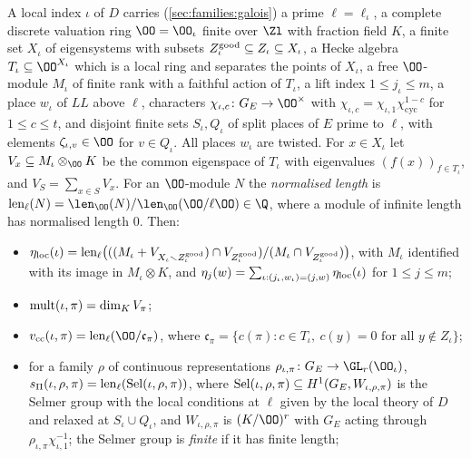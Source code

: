\begin{definition}\label{pf:linkN-sel:inv}
A local index $\iota$ of $D$ carries (\cref{sec:families:galois}) a prime $\ell=\ell_\iota$, a complete discrete valuation ring
$\OO=\OO_\iota$ finite over $\Zl$ with fraction field $K$, a finite set $X_\iota$ of eigensystems with subsets
$Z^{\mathrm{good}}_\iota\subseteq Z_\iota\subseteq X_\iota$, a Hecke algebra $T_\iota\subseteq\OO^{X_\iota}$ which is a local ring and
separates the points of $X_\iota$, a free $\OO$-module $M_\iota$ of finite rank with a faithful action of $T_\iota$, a lift index
$1\le j_\iota\le m$, a place $w_\iota$ of $\mathit{LL}$ above $\ell$, characters $\chi_{\iota,c}\colon G_E\to\OO^\times$ with
$\chi_{\iota,c}=\chi_{\iota,1}\chi_{\mathrm{cyc}}^{1-c}$ for $1\le c\le t$, and disjoint finite sets $S_\iota,Q_\iota$ of split places
of $E$ prime to $\ell$, with elements $\zeta_{\iota,v}\in\OO$ for $v\in Q_\iota$. All places $w_\iota$ are twisted. For $x\in X_\iota$
let $V_x\subseteq M_\iota\otimes_\OO K$ be the common eigenspace of $T_\iota$ with eigenvalues $(f(x))_{f\in T_\iota}$, and
$V_S=\sum_{x\in S}V_x$. For an $\OO$-module $N$ the \emph{normalised length} is
$\linkNsellen(N)=\len_\OO(N)/\len_\OO(\OO/\ell\OO)\in\Q$, where a module of infinite length has normalised length $0$. Then:
\begin{itemize}
\item $\eta_{\mathrm{loc}}(\iota)=\operatorname{len}_{\ell}\bigl(((M_\iota+V_{X_\iota\smallsetminus Z^{\mathrm{good}}_\iota})\cap V_{Z^{\mathrm{good}}_\iota})/
(M_\iota\cap V_{Z^{\mathrm{good}}_\iota})\bigr)$, with $M_\iota$ identified with its image in $M_\iota\otimes K$, and
$\eta_j(w)=\sum_{\iota:(j_\iota,w_\iota)=(j,w)}\eta_{\mathrm{loc}}(\iota)$ for $1\le j\le m$;
\item $\mathrm{mult}(\iota,\pi)=\dim_KV_\pi$;
\item $\linkNselvcc(\iota,\pi)=\linkNsellen(\OO/\mathfrak c_\pi)$, where $\mathfrak c_\pi=\{c(\pi):c\in T_\iota,\ c(y)=0\text{ for all }
y\notin Z_\iota\}$;
\item for a family $\rho$ of continuous representations $\rho_{\iota,\pi}\colon G_E\to\GL_r(\OO_\iota)$,
$s_{\Pi}(\iota,\rho,\pi)=\operatorname{len}_{\ell}(\operatorname{Sel}(\iota,\rho,\pi))$, where $\operatorname{Sel}(\iota,\rho,\pi)\subseteq
H^1(G_E,W_{\iota,\rho,\pi})$ is the Selmer group with the local conditions at $\ell$ given by the local theory of $D$ and relaxed at
$S_\iota\cup Q_\iota$, and $W_{\iota,\rho,\pi}$ is $(K/\OO)^r$ with $G_E$ acting through $\rho_{\iota,\pi}\chi_{\iota,1}^{-1}$; the
Selmer group is \emph{finite} if it has finite length;

\end{itemize}
\end{definition}
